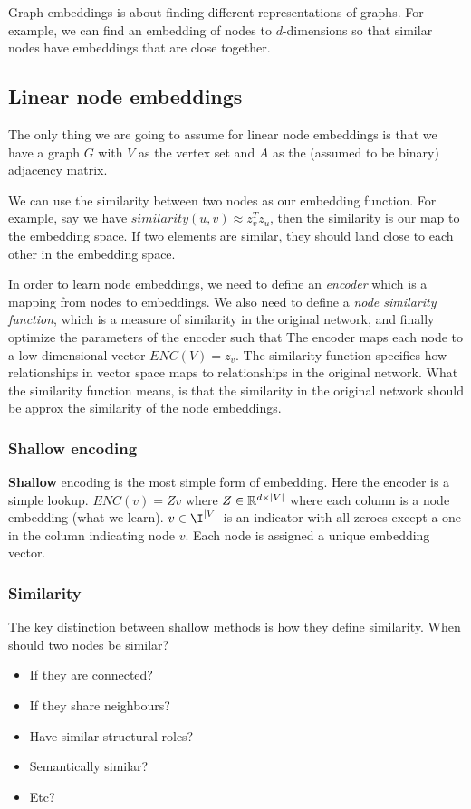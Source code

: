 Graph embeddings is about finding different representations of graphs. For example, we can find an embedding of nodes to $d$-dimensions so that similar nodes have embeddings that are close together. 

\subsection{Linear node embeddings}
    The only thing we are going to assume for linear node embeddings is that we have a graph $G$ with $V$ as the vertex set and $A$ as the (assumed to be binary) adjacency matrix. 
    
    We can use the similarity between two nodes as our embedding function. For example, say we have $similarity(u,v) \approx z_v^T z_u$, then the similarity is our map to the embedding space. If two elements are similar, they should land close to each other in the embedding space. 
    
    In order to learn node embeddings, we need to define an \emph{encoder} which is a mapping from nodes to embeddings. We also need to define a \emph{node similarity function}, which is a measure of similarity in the original network, and finally optimize the parameters of the encoder such that 
    The encoder maps each node to a low dimensional vector $ENC(V) = z_v$. The similarity function specifies how relationships in vector space maps to relationships in the original network. What the similarity function means, is that the similarity in the original network should be approx the similarity of the node embeddings.
    
\subsubsection{Shallow encoding}
    \textbf{Shallow} encoding is the most simple form of embedding. Here the encoder is a simple lookup. $ENC(v) = Zv$ where $Z \in \mathbb{R}^{d \times |V|}$ where each column is a node embedding (what we learn). $v \in \I^{|V|}$ is an indicator with all zeroes except a one in the column indicating node $v$. Each node is assigned a unique embedding vector. 
    
\subsubsection{Similarity}
    The key distinction between shallow methods is how they define similarity. When should two nodes be similar? 
    \begin{itemize}
        \item If they are connected?
        \item If they share neighbours?
        \item Have similar structural roles?
        \item Semantically similar?
        \item Etc?
    \end{itemize}
    
